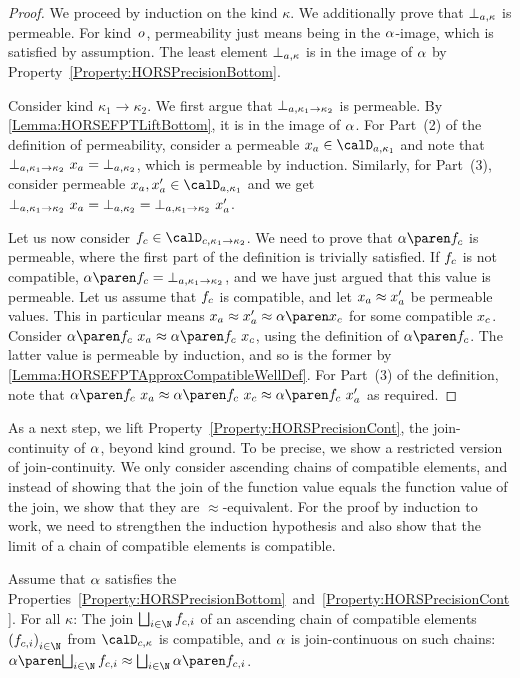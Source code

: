 \documentclass[../../diss.tex]{subfiles}
\begin{document}
\begin{proof}
    We proceed by induction on the kind $\kappa$.
    We additionally prove that $\bota{\kappa}$ is permeable.
    For kind~$o$, permeability just means being in the $\abs$-image, which is satisfied by assumption.
    The least element $\bota{\kappa}$ is in the image of $\abs$ by Property~\ref{Property:HORSPrecisionBottom}.

    Consider kind $\kappa_1 \to \kappa_2$.
    We first argue that $\bota{\kappa_1 \to \kappa_2}$ is permeable.
    By \cref{Lemma:HORSEFPTLiftBottom}, it is in the image of $\abs$.
    For Part~(2) of the definition of permeability, consider a permeable $\xa \in \domaina{\kappa_1}$ and note that $\bota{\kappa_1 \to \kappa_2} \appl \xa = \bota{\kappa_2}$, which is permeable by induction.
    Similarly, for Part~(3), consider permeable $\xa, \xa' \in \domaina{\kappa_1}$ and we get $\bota{\kappa_1 \to \kappa_2} \appl \xa = \bota{\kappa_2} = \bota{\kappa_1 \to \kappa_2} \appl \xa'$.

    Let us now consider $\fc \in \domainc{\kappa_1 \to \kappa_2}$.
    We need to prove that $\abs{\fc}$ is permeable, where the first part of the definition is trivially satisfied.
    If $f_c$ is not compatible, $\abs{\fc} = \bota{\kappa_1 \to \kappa_2}$, and we have just argued that this value is permeable.
    Let us assume that $f_c$ is compatible, and let $x_a \approx x_a'$ be permeable values.
    This in particular means $\xa \approx \xa' \approx \abs{\xc}$ for some compatible $x_c$.
    Consider $\abs{\fc} \appl \xa \approx \abs{\fc \appl \xc}$, using the definition of $\abs{\fc}$.
    The latter value is permeable by induction, and so is the former by \cref{Lemma:HORSEFPTApproxCompatibleWellDef}.
    For Part~(3) of the definition, note that $\abs{\fc} \appl \xa \approx \abs{\fc \appl \xc} \approx \abs{\fc} \appl \xa'$ as required.
\end{proof}

As a next step, we lift Property~\ref{Property:HORSPrecisionCont}, the join-continuity of $\abs$, beyond kind ground.
To be precise, we show a restricted version of join-continuity.
We only consider ascending chains of compatible elements, and instead of showing that the join of the function value equals the function value of the join, we show that they are $\approx$-equivalent.
For the proof by induction to work, we need to strengthen the induction hypothesis and also show that the limit of a chain of compatible elements is compatible.

\begin{lemma}%
\label{Lemma:HORSEFPTLiftJoinContinuity}%
    Assume that $\abs$ satisfies the Properties~\ref{Property:HORSPrecisionBottom}~and~\ref{Property:HORSPrecisionCont}.
    For all $\kappa$:
    The join $\bigsqcup_{i \in \N} \fci$ of an ascending chain of compatible elements ${(\fci)}_{i \in \N}$ from $\domainc{\kappa}$ is compatible, and $\abs$ is join-continuous on such chains:
    $\abs{ \bigsqcup_{i \in \N} \fci } \approx \bigsqcup_{i \in \N} \abs{\fci}$.
\end{lemma}
\end{document}
